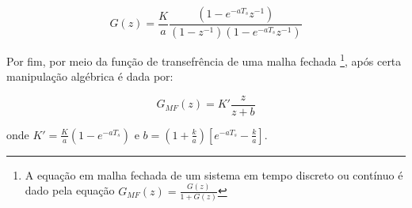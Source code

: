         \begin{equation}
            G(z) = \frac{K}{a} \frac{(1 - e^{-aT_s}z^{-1})}{(1-z^{-1})(1 - e^{-aT_s}z^{-1})}
        \end{equation}
    
    Por fim, por meio da função de transefrência de uma malha fechada \footnote{A equação em malha fechada de um sistema em tempo discreto ou contínuo é dado pela equação $G_{MF}(z) = \frac{G(z)}{1+G(z)}$}, após certa manipulação algébrica é dada por:
    
        \begin{equation}
            G_{MF}(z) = K' \frac{z}{z+b}
        \end{equation}
        
    onde $K' = \frac{K}{a} (1-e^{-aT_s}) \mbox{ e } b = (1 + \frac{k}{a})\left[e^{-aT_s} - \frac{k}{a} \right] $.
